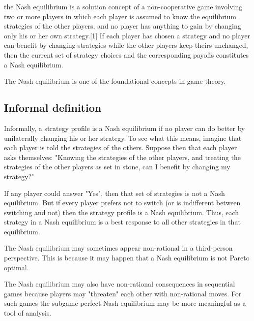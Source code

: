 the Nash equilibrium is a solution concept of a non-cooperative game involving two or more players in which each player is assumed to know the equilibrium strategies of the other players, and no player has anything to gain by changing only his or her own strategy.[1] If each player has chosen a strategy and no player can benefit by changing strategies while the other players keep theirs unchanged, then the current set of strategy choices and the corresponding payoffs constitutes a Nash equilibrium. 

The Nash equilibrium is one of the foundational concepts in game theory.



\subsection{Informal definition}
Informally, a strategy profile is a Nash equilibrium if no player can do better by unilaterally changing his or her strategy. To see what this means, imagine that each player is told the strategies of the others. Suppose then that each player asks themselves: "Knowing the strategies of the other players, and treating the strategies of the other players as set in stone, can I benefit by changing my strategy?"

If any player could answer "Yes", then that set of strategies is not a Nash equilibrium. But if every player prefers not to switch (or is indifferent between switching and not) then the strategy profile is a Nash equilibrium. Thus, each strategy in a Nash equilibrium is a best response to all other strategies in that equilibrium.

The Nash equilibrium may sometimes appear non-rational in a third-person perspective. This is because it may happen that a Nash equilibrium is not Pareto optimal.

The Nash equilibrium may also have non-rational consequences in sequential games because players may "threaten" each other with non-rational moves. For such games the subgame perfect Nash equilibrium may be more meaningful as a tool of analysis.
